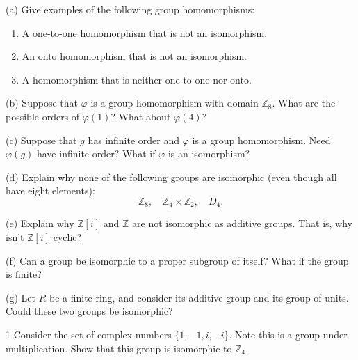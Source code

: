 \begin{problem}[Warmup]{(a)}
    Give examples of the following group homomorphisms:
    \begin{enumerate}
        \item[(a)] A one-to-one homomorphism that is not an isomorphism.
        \item[(b)] An onto homomorphism that is not an isomorphism.
        \item[(c)] A homomorphism that is neither one-to-one nor onto.
    \end{enumerate}
\end{problem}
\unsolved

\begin{problem}[Warmup]{(b)}
    Suppose that $\varphi$ is a group homomorphism with domain $\mathbb{Z}_8$. What are the possible orders of $\varphi(1)$? What about $\varphi(4)$?
\end{problem}
\unsolved

\begin{problem}[Warmup]{(c)}
    Suppose that $g$ has infinite order and $\varphi$ is a group homomorphism. Need $\varphi(g)$ have infinite order? What if $\varphi$ is an isomorphism?
\end{problem}
\unsolved

\begin{problem}[Warmup]{(d)}
    Explain why none of the following groups are isomorphic (even though all have eight elements): \[\mathbb{Z}_8, \quad \mathbb{Z}_4 \times \mathbb{Z}_2, \quad D_4.\]
\end{problem}
\unsolved

\begin{problem}[Warmup]{(e)}
    Explain why $\mathbb{Z}[i]$ and $\mathbb{Z}$ are not isomorphic as additive groups. That is, why isn't $\mathbb{Z}[i]$ cyclic?
\end{problem}
\unsolved

\begin{problem}[Warmup]{(f)}
    Can a group be isomorphic to a proper subgroup of itself? What if the group is finite?
\end{problem}
\unsolved

\begin{problem}[Warmup]{(g)}
    Let $R$ be a finite ring, and consider its additive group and its group of units. Could these two groups be isomorphic?
\end{problem}
\unsolved

\begin{problem}{1}
    Consider the set of complex numbers $\{1, -1, i, -i\}$. Note this is a group under
    multiplication. Show that this group is isomorphic to $\mathbb{Z}_4$.
\end{problem}
\unsolved

